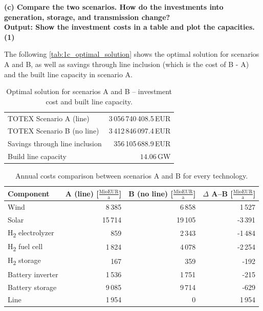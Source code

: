 \textbf{
    (c) Compare the two scenarios. How do the investments into generation, storage, and transmission change? \\
    Output: Show the investment costs in a table and plot the capacities.(1)
    }

The following \autoref{tab:1c_optimal_solution} shows the optimal solution for scenarios A and B, as well as savings through line inclusion (which is the cost of B - A) and the built line capacity in scenario A. 

\begin{table}[h]
    \centering
    \begin{tabular}{l r}
        \hline
        TOTEX Scenario A (line)         & 3\,056\,740\,408.5\,EUR  \\
        TOTEX Scenario B (no line)      & 3\,412\,846\,097.4\,EUR  \\
        Savings through line inclusion  & 356\,105\,688.9\,EUR     \\
        Build line capacity             & $14.06$\,GW              \\
        \hline
    \end{tabular}
    \caption{Optimal solution for scenarios A and B – investment cost and built line capacity.}
    \label{tab:1c_optimal_solution}
\end{table}


\begin{table}[ht]
    \centering
    \begin{tabular}{l r r r}
        \hline
        Component & A (line) [$\frac{\text{MioEUR}}{\text{a}}$] & B (no line) [$\frac{\text{MioEUR}}{\text{a}}$] & $\Delta$ A--B [$\frac{\text{MioEUR}}{\text{a}}$] \\
        \hline
        Wind                                    & 8\,385  & 6\,858  & 1\,527    \\
        Solar                                   & 15\,714 & 19\,105 & -3\,391   \\
        H\textsubscript{2} electrolyzer         & 859     & 2\,343  & -1\,484   \\
        H\textsubscript{2} fuel cell            & 1\,824  & 4\,078  & -2\,254   \\
        H\textsubscript{2} storage              & 167     & 359     & -192      \\
        Battery inverter                        & 1\,536  & 1\,751  & -215      \\
        Battery storage                         & 9\,085  & 9\,714  & -629      \\
        Line                                    & 1\,954  & 0       & 1\,954    \\
        \hline
    \end{tabular}
    \caption{Annual costs comparison between scenarios A and B for every technology.}
    \label{tab:1c_annual_costs_comparison_every_tech}
\end{table}


